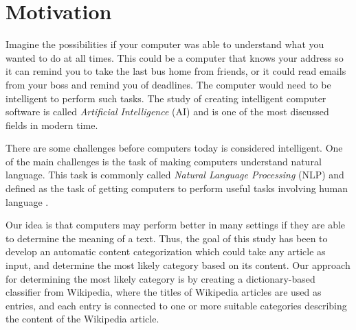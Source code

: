 \section{Motivation}
\label{sec:motivation}
Imagine the possibilities if your computer was able to understand what you wanted to do at all times. This could be a computer that knows your address so it can remind you to take the last bus home from friends, or it could read emails from your boss and remind you of deadlines. The computer would need to be intelligent to perform such tasks. The study of creating intelligent computer software is called \emph{Artificial Intelligence} (AI) and is one of the most discussed fields in modern time. 

There are some challenges before computers today is considered intelligent. One of the main challenges is the task of making computers understand natural language. This task is commonly called \emph{Natural Language Processing} (NLP) and defined as the task of getting computers to perform useful tasks involving human language \cite[p.~35]{jurafsky2000speech}. 

Our idea is that computers may perform better in many settings if they are able to determine the meaning of a text. Thus, the goal of this study has been to develop an automatic content categorization which could take any article as input, and determine the most likely category based on its content. Our approach for determining the most likely category is by creating a dictionary-based classifier from Wikipedia, where the titles of Wikipedia articles are used as entries, and each entry is connected to one or more suitable categories describing the content of the Wikipedia article. 

